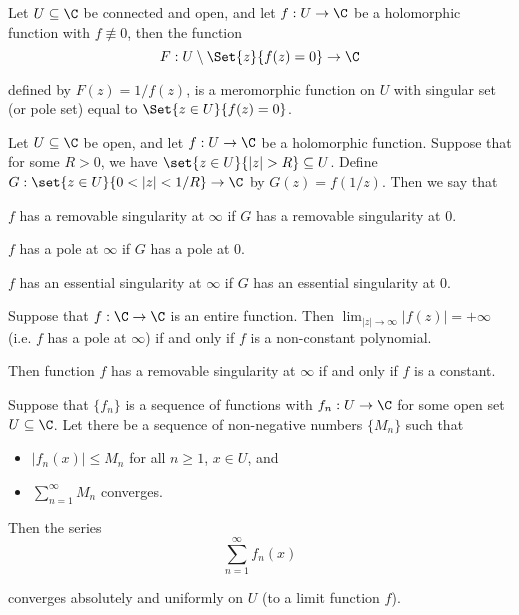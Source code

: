 \label{e672e2a}

Let $U\subseteq\C$ be connected and open, and let $f:U\to\C$ be a holomorphic
function with $f\not\equiv0$, then the function
$$
  F:U\setminus\Set{z}{f(z)=0}\to\C
$$

defined by $F(z)=1/f(z)$, is a meromorphic function on $U$ with singular set
(or pole set) equal to $\Set{z\in U}{f(z)=0}$.

\label{f4cee1f}

Let $U\subseteq\C$ be open, and let $f:U\to\C$ be a holomorphic function.
Suppose that for some $R>0$, we have $\set{z\in U}{|z|>R}\subseteq U$. Define
$G:\set{z\in U}{0<|z|<1/R}\to\C$ by $G(z)=f(1/z)$. Then we say that
\begin{enumerati}
  \item $f$ has a removable singularity at $\infty$ if $G$ has a removable
  singularity at $0$.
  \item $f$ has a pole at $\infty$ if $G$ has a pole at $0$.
  \item $f$ has an essential singularity at $\infty$ if $G$ has an essential
  singularity at $0$.
\end{enumerati}

\label{cabe102}

Suppose that $f:\C\to\C$ is an entire function. Then
$\lim_{|z|\to\infty}|f(z)|=+\infty$ (i.e. $f$ has a pole at $\infty$) if and
only if $f$ is a non-constant polynomial.

Then function $f$ has a removable singularity at $\infty$ if and only if $f$ is
a constant.

\label{d4a96c1}

Suppose that $\{f_n\}$ is a sequence of functions with $f_n:U\to\C$ for some
open set $U\subseteq\C$. Let there be a sequence of non-negative numbers
$\{M_n\}$ such that
\begin{itemize}
  \item $|f_n(x)|\leq M_n$ for all $n\geq1$, $x\in U$, and
  \item $\sum_{n=1}^\infty M_n$ converges.
\end{itemize}

Then the series
\begin{equation*}
  \sum_{n=1}^\infty f_n(x)
\end{equation*}

converges absolutely and uniformly on $U$ (to a limit function $f$).
